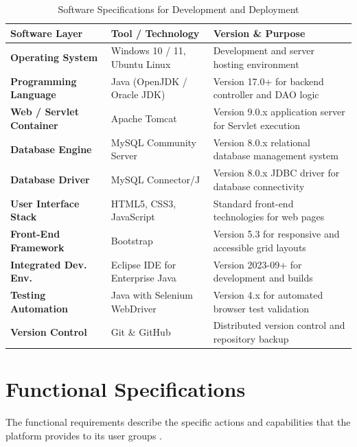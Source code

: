 \documentclass[12pt,a4paper]{report}
\begin{document}
\begin{table}[H]
\centering
\small
\caption{Software Specifications for Development and Deployment}
\label{tab:software_specs}
\begin{tabularx}{\textwidth}{|L{3.5cm}|L{4.0cm}|J|}
\hline
\textbf{Software Layer} & \textbf{Tool / Technology} & \textbf{Version \& Purpose} \\ \hline
\textbf{Operating System} & Windows 10 / 11, Ubuntu Linux & Development and server hosting environment \\ \hline
\textbf{Programming Language} & Java (OpenJDK / Oracle JDK) & Version 17.0+ for backend controller and DAO logic \\ \hline
\textbf{Web / Servlet Container} & Apache Tomcat & Version 9.0.x application server for Servlet execution \\ \hline
\textbf{Database Engine} & MySQL Community Server & Version 8.0.x relational database management system \\ \hline
\textbf{Database Driver} & MySQL Connector/J & Version 8.0.x JDBC driver for database connectivity \\ \hline
\textbf{User Interface Stack} & HTML5, CSS3, JavaScript & Standard front-end technologies for web pages \\ \hline
\textbf{Front-End Framework} & Bootstrap & Version 5.3 for responsive and accessible grid layouts \\ \hline
\textbf{Integrated Dev. Env.} & Eclipse IDE for Enterprise Java & Version 2023-09+ for development and builds \\ \hline
\textbf{Testing Automation} & Java with Selenium WebDriver & Version 4.x for automated browser test validation \\ \hline
\textbf{Version Control} & Git \& GitHub & Distributed version control and repository backup \\ \hline
\end{tabularx}
\end{table}

\section{Functional Specifications}
The functional requirements describe the specific actions and capabilities that the platform provides to its user groups \cite{sommerville}.
\end{document}
